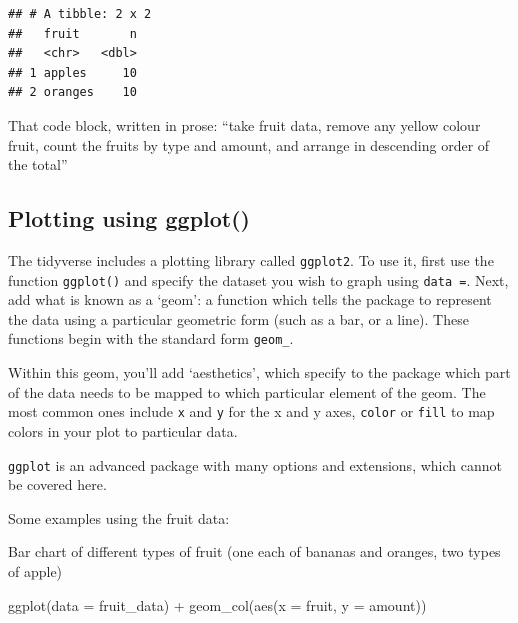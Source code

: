 \documentclass[
]{book}
\newenvironment{Shaded}{\begin{snugshade}}{\end{snugshade}}
\newcommand{\AttributeTok}[1]{\textcolor[rgb]{0.77,0.63,0.00}{#1}}
\newcommand{\FunctionTok}[1]{\textcolor[rgb]{0.00,0.00,0.00}{#1}}
\newcommand{\NormalTok}[1]{#1}
\newcommand{\SpecialCharTok}[1]{\textcolor[rgb]{0.00,0.00,0.00}{#1}}
\begin{document}
\begin{verbatim}
## # A tibble: 2 x 2
##   fruit       n
##   <chr>   <dbl>
## 1 apples     10
## 2 oranges    10
\end{verbatim}

That code block, written in prose: ``take fruit data, remove any yellow colour fruit, count the fruits by type and amount, and arrange in descending order of the total''

\hypertarget{plotting-using-ggplot}{%
\subsection{Plotting using ggplot()}\label{plotting-using-ggplot}}

The tidyverse includes a plotting library called \texttt{ggplot2}. To use it, first use the function \texttt{ggplot()} and specify the dataset you wish to graph using \texttt{data\ =}. Next, add what is known as a `geom': a function which tells the package to represent the data using a particular geometric form (such as a bar, or a line). These functions begin with the standard form \texttt{geom\_}.

Within this geom, you'll add `aesthetics', which specify to the package which part of the data needs to be mapped to which particular element of the geom. The most common ones include \texttt{x} and \texttt{y} for the x and y axes, \texttt{color} or \texttt{fill} to map colors in your plot to particular data.

\texttt{ggplot} is an advanced package with many options and extensions, which cannot be covered here.

Some examples using the fruit data:

Bar chart of different types of fruit (one each of bananas and oranges, two types of apple)

\begin{Shaded}
\begin{Highlighting}[]
\FunctionTok{ggplot}\NormalTok{(}\AttributeTok{data =}\NormalTok{ fruit\_data) }\SpecialCharTok{+} \FunctionTok{geom\_col}\NormalTok{(}\FunctionTok{aes}\NormalTok{(}\AttributeTok{x =}\NormalTok{ fruit, }\AttributeTok{y =}\NormalTok{ amount))}
\end{Highlighting}
\end{Shaded}
\end{document}
